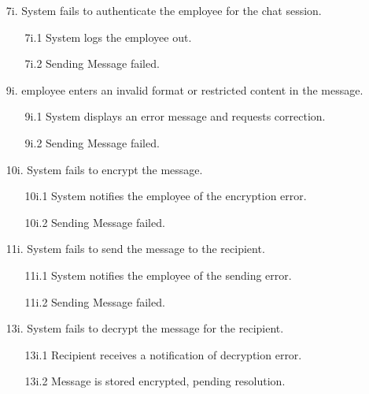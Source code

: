 \documentclass[]{article}
\begin{document}
\begin{enumerate}[{\bf BE1.}]
\begin{enumerate}[{\bf VP1.}]
\begin{enumerate}
\begin{enumerate}
                    \end{enumerate}
                    \item[7i.] System fails to authenticate the employee for the chat session.
                    \begin{enumerate}
                        \item[7i.1] System logs the employee out.
                        \item[7i.2] Sending Message failed.
                    \end{enumerate}
                    \item[9i.] employee enters an invalid format or restricted content in the message.
                    \begin{enumerate}
                        \item[9i.1] System displays an error message and requests correction.
                        \item[9i.2] Sending Message failed.
                    \end{enumerate}
                    \item[10i.] System fails to encrypt the message.
                    \begin{enumerate}
                        \item[10i.1] System notifies the employee of the encryption error.
                        \item[10i.2] Sending Message failed.
                    \end{enumerate}
                    \item[11i.] System fails to send the message to the recipient.
                    \begin{enumerate}
                        \item[11i.1] System notifies the employee of the sending error.
                        \item[11i.2] Sending Message failed.
                    \end{enumerate}
                    \item[13i.] System fails to decrypt the message for the recipient.
                    \begin{enumerate}
                        \item[13i.1] Recipient receives a notification of decryption error.
                        \item[13i.2] Message is stored encrypted, pending resolution.
                    \end{enumerate}

\end{enumerate}
\end{enumerate}
\end{enumerate}
\end{document}
